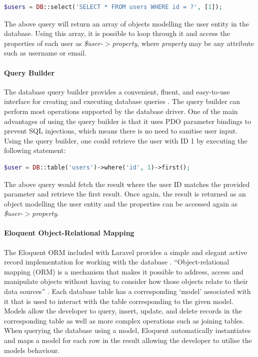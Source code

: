 \begin{lstlisting}[language=php]
	$users = DB::select('SELECT * FROM users WHERE id = ?', [1]);
\end{lstlisting}

The above query will return an array of objects modelling the user entity in the database. Using this array, it is possible to loop through it and access the properties of each user as \emph{\$user-$>$property}, where \emph{property} may be any attribute such as username or email.

\paragraph{Query Builder}
The database query builder provides a convenient, fluent, and easy-to-use interface for creating and executing database queries \cite{Laravel:QueryBuilder}. The query builder can perform most operations supported by the database driver. One of the main advantages of using the query builder is that it uses PDO parameter bindings to prevent SQL injections, which means there is no need to sanitise user input. Using the query builder, one could retrieve the user with ID 1 by executing the following statement:

\begin{lstlisting}[language=php]
	$user = DB::table('users')->where('id', 1)->first();
\end{lstlisting}

The above query would fetch the result where the user ID matches the provided parameter and retrieve the first result. Once again, the result is returned as an object modelling the user entity and the properties can be accessed again as \emph{\$user-$>$property}.

\paragraph{Eloquent Object-Relational Mapping}
The Eloquent ORM included with Laravel provides a simple and elegant active record implementation for working with the database \cite{Laravel:Eloquent}. ``Object-relational mapping (ORM) is a mechanism that makes it possible to address, access and manipulate objects without having to consider how those objects relate to their data sources'' \cite{TechTarget:ORM}. Each database table has a corresponding `model' associated with it that is used to interact with the table corresponding to the given model. Models allow the developer to query, insert, update, and delete records in the corresponding table as well as more complex operations such as joining tables. When querying the database using a model, Eloquent automatically instantiates and maps a model for each row in the result allowing the developer to utilise the models behaviour.

